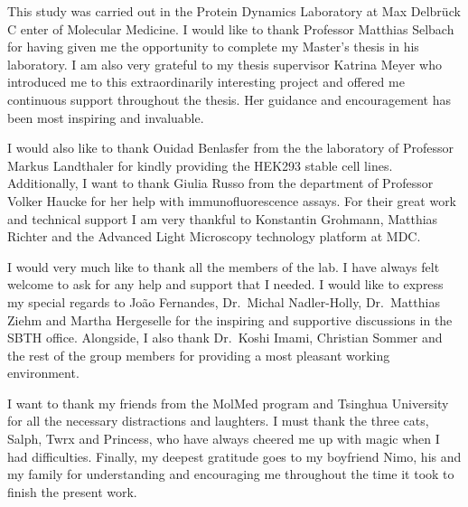 \documentclass[
12pt, %
english, %
onehalfspacing, %
headsepline, %
]{MastersDoctoralThesis} %
\begin{document}
\begin{acknowledgements}
\addchaptertocentry{\acknowledgementname} %
This study was carried out in the Protein Dynamics Laboratory at Max Delbr\"{u}ck C	enter of Molecular Medicine. I would like to thank Professor Matthias Selbach for having given me the opportunity to complete my Master's thesis in his laboratory. I am also very grateful to my thesis supervisor Katrina Meyer who introduced me to this extraordinarily interesting project and offered me continuous support throughout the thesis. Her guidance and encouragement has been most inspiring and invaluable.

I would also like to thank Ouidad Benlasfer from the the laboratory of Professor Markus Landthaler for kindly providing the HEK293 stable cell lines. Additionally, I want to thank Giulia Russo from the department of Professor Volker Haucke for her help with immunofluorescence assays. For their great work and technical support I am very thankful to Konstantin Grohmann, Matthias Richter and the Advanced Light Microscopy technology platform at MDC.

I would very much like to thank all the members of the lab. I have always felt welcome to ask for any help and support that I needed. I would like to express my special regards to Jo\~{a}o Fernandes, Dr.\ Michal Nadler-Holly, Dr.\ Matthias Ziehm and Martha Hergeselle for the inspiring and supportive discussions in the SBTH office. Alongside, I also thank Dr.\ Koshi Imami, Christian Sommer and the rest of the group members for providing a most pleasant working environment.

I want to thank my friends from the MolMed program and Tsinghua University for all the necessary distractions and laughters. I must thank the three cats, Salph, Twrx and Princess, who have always cheered me up with magic when I had difficulties. Finally, my deepest gratitude goes to my boyfriend Nimo, his and my family for understanding and encouraging me throughout the time it took to finish the present work.

\end{acknowledgements}


\end{document}
